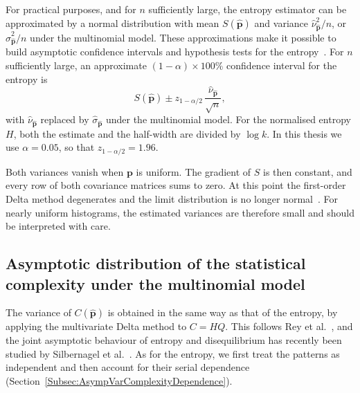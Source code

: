 For practical purposes, and for $n$ sufficiently large, the entropy estimator can be approximated by a normal distribution with mean $S(\widehat{\mathbf{p}})$ and variance $\widehat{\nu}^2_{\widehat{\mathbf{p}}}/n$, or $\widehat{\sigma}^2_{\widehat{\mathbf{p}}}/n$ under the multinomial model. These approximations make it possible to build asymptotic confidence intervals and hypothesis tests for the entropy~\cite{Rey2023a}. For $n$ sufficiently large, an approximate $(1-\alpha)\times100\%$ confidence interval for the entropy is
\begin{equation}
	S(\widehat{\mathbf{p}})\pm z_{1-\alpha/2}\,\frac{\widehat{\nu}_{\widehat{\mathbf{p}}}}{\sqrt{n}},
	\label{eq:CIEntropy}
\end{equation}
with $\widehat{\nu}_{\widehat{\mathbf{p}}}$ replaced by $\widehat{\sigma}_{\widehat{\mathbf{p}}}$ under the multinomial model. For the normalised entropy $H$, both the estimate and the half-width are divided by $\log k$. In this thesis we use $\alpha=0.05$, so that $z_{1-\alpha/2}=1.96$.

Both variances vanish when $\mathbf{p}$ is uniform. The gradient of $S$ is then constant, and every row of both covariance matrices sums to zero. At this point the first-order Delta method degenerates and the limit distribution is no longer normal~\cite{Rey2024}. For nearly uniform histograms, the estimated variances are therefore small and should be interpreted with care.

\subsection{Asymptotic distribution of the statistical complexity under the multinomial model}\label{Subsec:AsympVarComplexity}

The variance of $C(\widehat{\mathbf{p}})$ is obtained in the same way as that of the entropy, by applying the multivariate Delta method to $C=HQ$. This follows Rey et al.~\cite{Rey2025}, and the joint asymptotic behaviour of entropy and disequilibrium has recently been studied by Silbernagel et al.~\cite{silbernagel2025joint}. As for the entropy, we first treat the patterns as independent and then account for their serial dependence (Section~\ref{Subsec:AsympVarComplexityDependence}).

